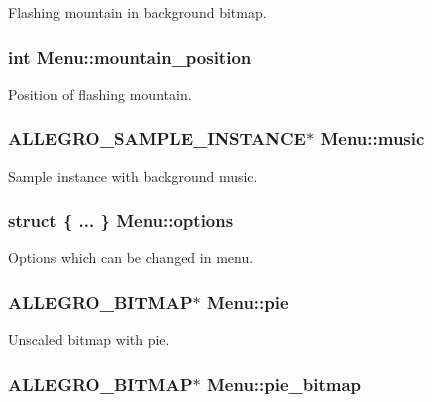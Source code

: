Flashing mountain in background bitmap. \hypertarget{structMenu_a10770a9453a92c77d64c7fdb0e34e725}{
\subsubsection[{mountain\-\_\-position}]{\setlength{\rightskip}{0pt plus 5cm}int Menu\-::mountain\-\_\-position}}\label{structMenu_a10770a9453a92c77d64c7fdb0e34e725}
Position of flashing mountain. \hypertarget{structMenu_a7b8c42bd64118eb18dceafbd9ac8b3d5}{
\subsubsection[{music}]{\setlength{\rightskip}{0pt plus 5cm}A\-L\-L\-E\-G\-R\-O\-\_\-\-S\-A\-M\-P\-L\-E\-\_\-\-I\-N\-S\-T\-A\-N\-C\-E$\ast$ Menu\-::music}}\label{structMenu_a7b8c42bd64118eb18dceafbd9ac8b3d5}
Sample instance with background music. \hypertarget{structMenu_a6ee9749efa96939d50728015a3fd6609}{
\subsubsection[{options}]{\setlength{\rightskip}{0pt plus 5cm}struct \{ ... \}   Menu\-::options}}\label{structMenu_a6ee9749efa96939d50728015a3fd6609}
Options which can be changed in menu. \hypertarget{structMenu_a397eb035f88ef8138c4ba29f3fc1d63c}{
\subsubsection[{pie}]{\setlength{\rightskip}{0pt plus 5cm}A\-L\-L\-E\-G\-R\-O\-\_\-\-B\-I\-T\-M\-A\-P$\ast$ Menu\-::pie}}\label{structMenu_a397eb035f88ef8138c4ba29f3fc1d63c}
Unscaled bitmap with pie. \hypertarget{structMenu_ab46ce3041264bac0aabde3abd7549877}{
\subsubsection[{pie\-\_\-bitmap}]{\setlength{\rightskip}{0pt plus 5cm}A\-L\-L\-E\-G\-R\-O\-\_\-\-B\-I\-T\-M\-A\-P$\ast$ Menu\-::pie\-\_\-bitmap}}\label{structMenu_ab46ce3041264bac0aabde3abd7549877}
